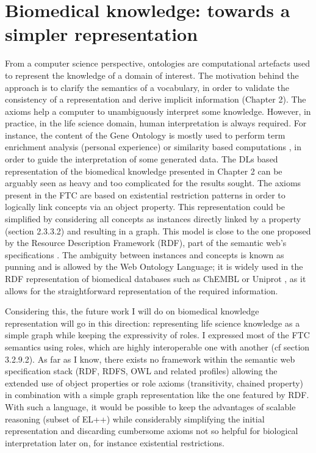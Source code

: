 \section{Biomedical knowledge: towards a simpler representation}
From a computer science perspective, ontologies are computational artefacts used to represent the knowledge of a domain of interest. The motivation behind the approach is to clarify the semantics of a vocabulary, in order to validate the consistency of a representation and derive implicit information (Chapter 2). The axioms help a computer to unambiguously interpret some knowledge. However, in practice, in the life science domain, human interpretation is always required. For instance, the content of the Gene Ontology is mostly used to perform term enrichment analysis (personal experience) or similarity based computations \citep{pesquita2009semantic}, in order to guide the interpretation of some generated data. The DLs based representation of the biomedical knowledge presented in Chapter 2 can be arguably seen as heavy and too complicated for the results sought. The axioms present in the FTC are based on existential restriction patterns in order to logically link concepts via an object property. This representation could be simplified by considering all concepts as instances directly linked by a property (section 2.3.3.2) and resulting in a graph. This model is close to the one proposed by the Resource Description Framework (RDF), part of the semantic web’s specifications \citep{klyne2006resource}. The ambiguity between instances and concepts is known as punning and is allowed by the Web Ontology Language; it is widely used in the RDF representation of biomedical databases such as ChEMBL or Uniprot \citep{jupp2014ebi}, as it allows for the straightforward representation of the required information.

Considering this, the future work I will do on biomedical knowledge representation will go in this direction: representing life science knowledge as a simple graph while keeping the expressivity of roles. I expressed most of the FTC semantics using roles, which are highly interoperable one with another (cf section 3.2.9.2). As far as I know, there exists no framework within the semantic web specification stack (RDF, RDFS, OWL and related profiles) allowing the extended use of object properties or role axioms (transitivity, chained property) in combination with a simple graph representation like the one featured by RDF. With such a language, it would be possible to keep the advantages of scalable reasoning (subset of EL++) while considerably simplifying the initial representation and discarding cumbersome axioms not so helpful for biological interpretation later on, for instance existential restrictions.


